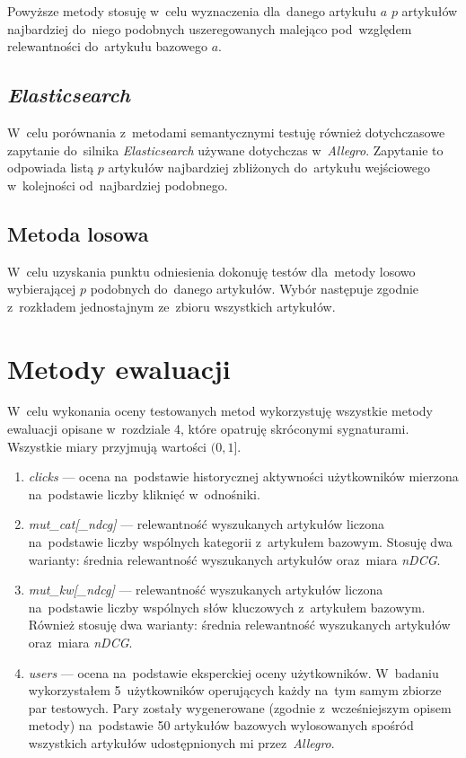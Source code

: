 \documentclass[pl]{minipw} %
\begin{document}
Powyższe metody stosuję w~celu wyznaczenia dla~danego artykułu $a$ $p$ artykułów najbardziej do~niego podobnych uszeregowanych malejąco pod~względem relewantności do~artykułu bazowego $a$.

\subsection{\textit{Elasticsearch}}
W~celu porównania z~metodami semantycznymi testuję również dotychczasowe zapytanie do~silnika \textit{Elasticsearch} używane dotychczas w~\textit{Allegro}. Zapytanie to odpowiada listą $p$ artykułów najbardziej zbliżonych do~artykułu wejściowego w~kolejności od~najbardziej podobnego.

\subsection{Metoda losowa}
W~celu uzyskania punktu odniesienia dokonuję testów dla~metody losowo wybierającej $p$ podobnych do~danego artykułów. Wybór następuje zgodnie z~rozkładem jednostajnym ze~zbioru wszystkich artykułów.

\section{Metody ewaluacji}

W~celu wykonania oceny testowanych metod wykorzystuję wszystkie metody ewaluacji opisane w~rozdziale 4, które opatruję skróconymi sygnaturami. Wszystkie miary przyjmują wartości $(0,1]$.
\begin{enumerate}
	\item \textit{clicks} --- ocena na~podstawie historycznej aktywności użytkowników mierzona na~podstawie liczby kliknięć w~odnośniki.
	\item \textit{mut\_cat[\_ndcg]} --- relewantność wyszukanych artykułów liczona na~podstawie liczby wspólnych kategorii z~artykułem bazowym. Stosuję dwa warianty: średnia relewantność wyszukanych artykułów oraz~miara \textit{nDCG}.
	\item \textit{mut\_kw[\_ndcg]} --- relewantność wyszukanych artykułów liczona na~podstawie liczby wspólnych słów kluczowych z~artykułem bazowym. Również stosuję dwa warianty: średnia relewantność wyszukanych artykułów oraz~miara \textit{nDCG}.
	\item \textit{users} --- ocena na~podstawie eksperckiej oceny użytkowników. W~badaniu wykorzystałem 5~użytkowników operujących każdy na~tym samym zbiorze par testowych. Pary zostały wygenerowane (zgodnie z~wcześniejszym opisem metody) na~podstawie 50 artykułów bazowych wylosowanych spośród wszystkich artykułów udostępnionych mi przez~\textit{Allegro}.
\end{enumerate}
\end{document}
